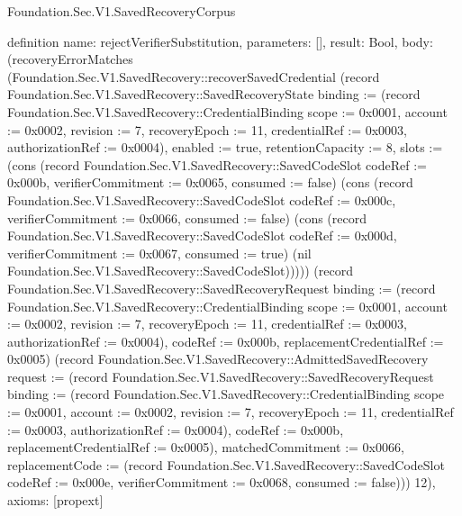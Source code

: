 \begin{lexlean}{Foundation.Sec.V1.SavedRecoveryCorpus}
\begin{semanticmodule}
definition{
  name: rejectVerifierSubstitution,
  parameters: [],
  result: Bool,
  body: (recoveryErrorMatches (Foundation.Sec.V1.SavedRecovery::recoverSavedCredential (record Foundation.Sec.V1.SavedRecovery::SavedRecoveryState {binding := (record Foundation.Sec.V1.SavedRecovery::CredentialBinding {scope := 0x0001, account := 0x0002, revision := 7, recoveryEpoch := 11, credentialRef := 0x0003, authorizationRef := 0x0004}), enabled := true, retentionCapacity := 8, slots := (cons (record Foundation.Sec.V1.SavedRecovery::SavedCodeSlot {codeRef := 0x000b, verifierCommitment := 0x0065, consumed := false}) (cons (record Foundation.Sec.V1.SavedRecovery::SavedCodeSlot {codeRef := 0x000c, verifierCommitment := 0x0066, consumed := false}) (cons (record Foundation.Sec.V1.SavedRecovery::SavedCodeSlot {codeRef := 0x000d, verifierCommitment := 0x0067, consumed := true}) (nil Foundation.Sec.V1.SavedRecovery::SavedCodeSlot))))}) (record Foundation.Sec.V1.SavedRecovery::SavedRecoveryRequest {binding := (record Foundation.Sec.V1.SavedRecovery::CredentialBinding {scope := 0x0001, account := 0x0002, revision := 7, recoveryEpoch := 11, credentialRef := 0x0003, authorizationRef := 0x0004}), codeRef := 0x000b, replacementCredentialRef := 0x0005}) (record Foundation.Sec.V1.SavedRecovery::AdmittedSavedRecovery {request := (record Foundation.Sec.V1.SavedRecovery::SavedRecoveryRequest {binding := (record Foundation.Sec.V1.SavedRecovery::CredentialBinding {scope := 0x0001, account := 0x0002, revision := 7, recoveryEpoch := 11, credentialRef := 0x0003, authorizationRef := 0x0004}), codeRef := 0x000b, replacementCredentialRef := 0x0005}), matchedCommitment := 0x0066, replacementCode := (record Foundation.Sec.V1.SavedRecovery::SavedCodeSlot {codeRef := 0x000e, verifierCommitment := 0x0068, consumed := false})})) 12),
  axioms: [propext]
}


\end{semanticmodule}
\end{lexlean}
